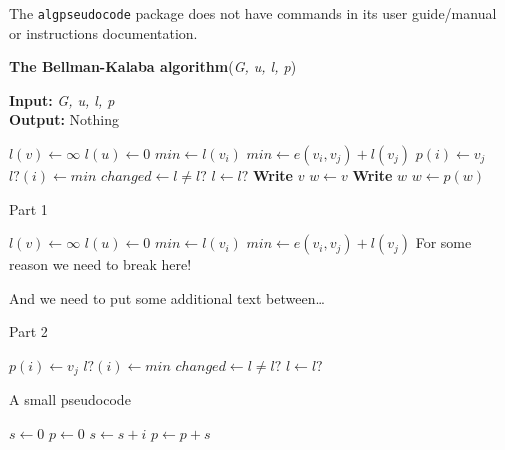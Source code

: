 \documentclass{article}
\begin{document}
The {\tt algpseudocode} package does not have commands in its user guide/manual or instructions documentation.


\begin{algorithm}
\caption{{\bf The Bellman-Kalaba algorithm}({\it G, u, l, p})}
{\textbf{Input:} {\it G, u, l, p}} \\
{\textbf{Output:} Nothing}
\begin{algorithmic}[1]

		\State $l(v) \leftarrow \infty$
	\EndFor
	\State $l(u) \leftarrow 0$
	\Repeat
		\State $min \leftarrow l(v_i)$
					\State $min \leftarrow e(v_i, v_j) + l(v_j)$
					\State $p(i) \leftarrow v_j$
				\EndIf
			\EndFor
			\State $l?(i) \leftarrow min$
		\EndFor
		\State $changed \leftarrow l \not= l?$
		\State $l \leftarrow l?$
\EndProcedure
\Statex
{}
		\State \textbf{Write} $v$
	\Else
		\State $w \leftarrow v$
			\State \textbf{Write} $w$
			\State $w \leftarrow p(w)$
		\EndWhile
	\EndIf
\EndProcedure
\end{algorithmic}
\end{algorithm}


\newpage





\begin{algorithm}
\caption{Part 1}
\begin{algorithmic}[1]
		\State $l(v) \leftarrow \infty$
	\EndFor
	\State $l(u) \leftarrow 0$
	\Repeat
			\State $min \leftarrow l(v_i)$
					\State $min \leftarrow e(v_i, v_j) + l(v_j)$
					\State \Comment For some reason we need to break here!
\end{algorithmic}
\end{algorithm}

And we need to put some additional text between\dots


\begin{algorithm}[h]
\caption{Part 2}
\begin{algorithmic}[1]
						\State $p(i) \leftarrow v_j$
					\EndIf
				\EndFor
			\State $l?(i) \leftarrow min$
		\EndFor
		\State $changed \leftarrow l \not= l?$
		\State $l \leftarrow l?$
\EndProcedure
\end{algorithmic}
\end{algorithm}




\begin{algorithm}
\caption{A small pseudocode}
\begin{algorithmic}[1]
\State $s \gets 0$
\State $p \gets 0$
	\State $s \gets s + i$
	\State $p \gets p + s$
\EndFor
\end{algorithmic}
\end{algorithm}
\end{document}
